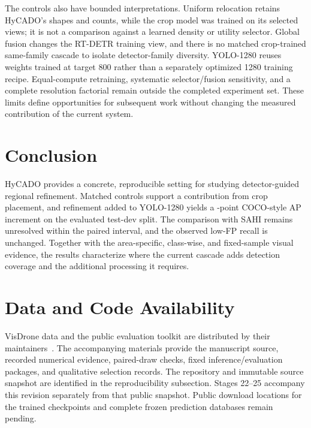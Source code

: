 \documentclass[journal]{IEEEtran}
\begin{document}
The controls also have bounded interpretations. Uniform relocation retains HyCADO's shapes and counts, while the crop model was trained on its selected views; it is not a comparison against a learned density or utility selector. Global fusion changes the RT-DETR training view, and there is no matched crop-trained same-family cascade to isolate detector-family diversity. YOLO-1280 reuses weights trained at target 800 rather than a separately optimized 1280 training recipe. Equal-compute retraining, systematic selector/fusion sensitivity, and a complete resolution factorial remain outside the completed experiment set. These limits define opportunities for subsequent work without changing the measured contribution of the current system.

\section{Conclusion}
HyCADO provides a concrete, reproducible setting for studying detector-guided regional refinement. Matched controls support a contribution from crop placement, and refinement added to YOLO-1280 yields a \CocoHY-point COCO-style AP increment on the evaluated test-dev split. The comparison with SAHI remains unresolved within the paired interval, and the observed low-FP recall is unchanged. Together with the area-specific, class-wise, and fixed-sample visual evidence, the results characterize where the current cascade adds detection coverage and the additional processing it requires.

\section*{Data and Code Availability}
VisDrone data and the public evaluation toolkit are distributed by their maintainers~\cite{du2019visdrone,visdrone_toolkit}. The accompanying materials provide the manuscript source, recorded numerical evidence, paired-draw checks, fixed inference/evaluation packages, and qualitative selection records. The repository and immutable source snapshot are identified in the reproducibility subsection. Stages 22--25 accompany this revision separately from that public snapshot. Public download locations for the trained checkpoints and complete frozen prediction databases remain pending.




\end{document}
